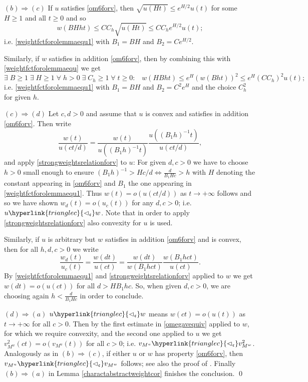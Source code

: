 \documentclass[10pt]{amsart}%
\numberwithin{equation}{section}
\theoremstyle{plain}
\begin{document}
$(b)\Rightarrow(c)$ If $u$ satisfies \eqref{om6forv}, then $\sqrt{u(Ht)}\le e^{H/2}u(t)$ for some $H\ge 1$ and all $t\ge 0$ and so
$$w(BHht)\le CC_h\sqrt{u(Ht)}\le CC_he^{H/2}u(t);$$
i.e. \eqref{weightfctforolemmaequ1} with $B_1=BH$ and $B_2=Ce^{H/2}$.

Similarly, if $w$ satisfies in addition \eqref{om6forv}, then by combining this with \eqref{weightfctforolemmaequ} we get
$$\exists\;B\ge 1\;\exists\;H\ge 1\;\forall\;h>0\;\exists\;C_h\ge 1\;\forall\;t\ge 0:\;\;\;w(HBht)\le e^{H}(w(Bht))^2\le e^H(CC_h)^2u(t);$$
i.e. \eqref{weightfctforolemmaequ1} with $B_1=BH$ and $B_2=C^2e^{H}$ and the choice $C_h^2$ for given $h$.

$(c)\Rightarrow(d)$ Let $c,d>0$ and assume that $u$ is convex and satisfies in addition \eqref{om6forv}. Then write $$\frac{w(t)}{u(ct/d)}=\frac{w(t)}{u((B_1h)^{-1}t)}\frac{u((B_1h)^{-1}t)}{u(ct/d)},$$
and apply \eqref{strongweightsrelationforv} to $u$: For given $d,c>0$ we have to choose $h>0$ small enough to ensure $(B_1h)^{-1}>Hc/d\Leftrightarrow\frac{d}{B_1Hc}>h$ with $H$ denoting the constant appearing in \eqref{om6forv} and $B_1$ the one appearing in \eqref{weightfctforolemmaequ1}. Thus $w(t)=o(u(ct/d))$ as $t\rightarrow+\infty$ follows and so we have shown $w_d(t)=o(u_c(t))$ for any $d,c>0$; i.e. $u\hyperlink{trianglec}{\vartriangleleft_{\mathfrak{c}}}w$. Note that in order to apply \eqref{strongweightsrelationforv} also convexity for $u$ is used.\vspace{6pt}

Similarly, if $u$ is arbitrary but $w$ satisfies in addition \eqref{om6forv} and is convex, then for all $h,d,c>0$ we write $$\frac{w_d(t)}{u_c(t)}=\frac{w(dt)}{u(ct)}=\frac{w(dt)}{w(B_1hct)}\frac{w(B_1hct)}{u(ct)}.$$
By \eqref{weightfctforolemmaequ1} and \eqref{strongweightsrelationforv} applied to $w$ we get $w(dt)=o(u(ct))$ for all $d>HB_1hc$. So, when given $d,c>0$, we are choosing again $h<\frac{d}{B_1Hc}$ in order to conclude.\vspace{6pt}

$(d)\Rightarrow(a)$ $u\hyperlink{trianglec}{\vartriangleleft_{\mathfrak{c}}}w$ means $w(ct)=o(u(t))$ as $t\rightarrow+\infty$ for all $c>0$. Then by the first estimate in \eqref{omegavequiv} applied to $w$, for which we require convexity, and the second one applied to $u$ we get $v^2_{M^w}(ct)=o(v_{M^u}(t))$ for all $c>0$; i.e. $v_{M^u}\hyperlink{trianglec}{\vartriangleleft_{\mathfrak{c}}}v^2_{M^w}$. Analogously as in $(b)\Rightarrow(c)$, if either $u$ or $w$ has property \eqref{om6forv}, then $v_{M^u}\hyperlink{trianglec}{\vartriangleleft_{\mathfrak{c}}}v_{M^w}$ follows; see also the proof of \cite[Prop. 3.22 $(ii)$]{weightedentirecharacterization}. Finally $(b)\Rightarrow(a)$ in Lemma \ref{charactabstractweightcor} finishes the conclusion.
\qed\enddemo
\end{document}
